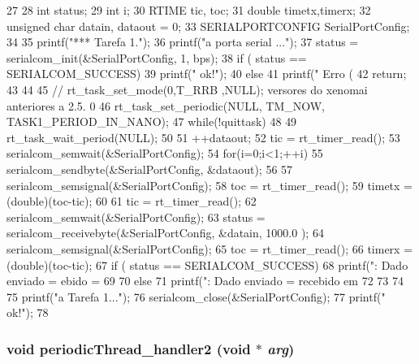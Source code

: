 \begin{DoxyCode}
27 {
28         int status;
29         int i;
30         RTIME tic, toc;
31         double timetx,timerx;
32         unsigned char datain, dataout = 0;
33         SERIALPORTCONFIG SerialPortConfig; 
34 
35         printf("\n**** Tarefa 1.");
36         printf("\nIniciando a porta serial ...");
37         status = serialcom_init(&SerialPortConfig, 1, bps);
38         if ( status ==  SERIALCOM_SUCCESS){
39                 printf(" ok!");
40         } else {
41                 printf(" Erro (%
42                 return;
43         }
44 
45         // rt_task_set_mode(0,T_RRB ,NULL); versores do xenomai anteriores a 2.5.
      0
46         rt_task_set_periodic(NULL, TM_NOW, TASK1_PERIOD_IN_NANO);
47         while(!quittask)
48         {       
49                 rt_task_wait_period(NULL);
50 
51                 ++dataout;
52                 tic = rt_timer_read();
53                 serialcom_semwait(&SerialPortConfig);
54                 for(i=0;i<1;++i){
55                         serialcom_sendbyte(&SerialPortConfig, &dataout);
56                 }
57                 serialcom_semsignal(&SerialPortConfig);
58                 toc = rt_timer_read();
59                 timetx = (double)(toc-tic);
60 
61                 tic = rt_timer_read();
62                 serialcom_semwait(&SerialPortConfig);
63                 status = serialcom_receivebyte(&SerialPortConfig, &datain, 1000.0
      );
64                 serialcom_semsignal(&SerialPortConfig);
65                 toc = rt_timer_read();
66                 timerx = (double)(toc-tic);
67                 if ( status == SERIALCOM_SUCCESS){
68                         printf(": Dado enviado = %
      ebido = %
69                 }
70                 else{
71                         printf(": Dado enviado = %
       recebido em %
72                 }
73         }
74 
75         printf("\nEncerrando a Tarefa 1...");
76         serialcom_close(&SerialPortConfig);
77         printf(" ok!");
78 }
\end{DoxyCode}
\subsubsection[{periodicThread\_\-handler2}]{\setlength{\rightskip}{0pt plus 5cm}void periodicThread\_\-handler2 (void $\ast$ {\em arg})}\label{eval_8c_a8597333258522dddfc564b5d86ef18fa}


